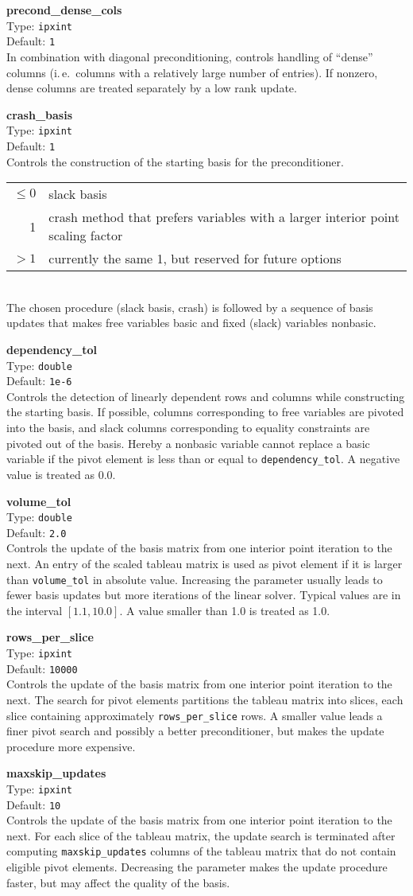 \documentclass{article}
\newcommand{\ct}{\texttt}
\newcommand{\param}[4]{
  \noindent\begin{minipage}{\textwidth}
    \textbf{#1}\\
    Type: \ct{#2}\\
    Default: \ct{#3}\\
    #4
  \end{minipage}
  \vskip 1\baselineskip
}
\begin{document}
\param{precond\_dense\_cols}{ipxint}{1}{
  In combination with diagonal preconditioning, controls handling of ``dense''
  columns (i.\,e.\ columns with a relatively large number of entries). If
  nonzero, dense columns are treated separately by a low rank update.
}

\param{crash\_basis}{ipxint}{1}{
  Controls the construction of the starting basis for the preconditioner. \\
  \begin{tabular}{rl}
    $\le0$ & slack basis \\
    1 & crash method that prefers variables with a larger interior point scaling
    factor \\
    $>1$ & currently the same 1, but reserved for future options
  \end{tabular} \\
  The chosen procedure (slack basis, crash) is followed by a sequence of basis
  updates that makes free variables basic and fixed (slack) variables nonbasic.
}

\param{dependency\_tol}{double}{1e-6}{
  Controls the detection of linearly dependent rows and columns while
  constructing the starting basis. If possible, columns corresponding to free
  variables are pivoted into the basis, and slack columns corresponding to
  equality constraints are pivoted out of the basis. Hereby a nonbasic variable
  cannot replace a basic variable if the pivot element is less than or equal to
  \ct{dependency\_tol}. A negative value is treated as 0.0.
}

\param{volume\_tol}{double}{2.0}{
  Controls the update of the basis matrix from one interior point iteration to
  the next. An entry of the scaled tableau matrix is used as pivot element if it
  is larger than \ct{volume\_tol} in absolute value. Increasing the parameter
  usually leads to fewer basis updates but more iterations of the linear solver.
  Typical values are in the interval $[1.1,10.0]$. A value smaller than 1.0 is
  treated as 1.0.
}

\param{rows\_per\_slice}{ipxint}{10000}{
  Controls the update of the basis matrix from one interior point iteration to
  the next. The search for pivot elements partitions the tableau matrix into
  slices, each slice containing approximately \ct{rows\_per\_slice} rows. A
  smaller value leads a finer pivot search and possibly a better preconditioner,
  but makes the update procedure more expensive.
}

\param{maxskip\_updates}{ipxint}{10}{
  Controls the update of the basis matrix from one interior point iteration to
  the next. For each slice of the tableau matrix, the update search is
  terminated after computing \ct{maxskip\_updates} columns of the tableau matrix
  that do not contain eligible pivot elements. Decreasing the parameter makes
  the update procedure faster, but may affect the quality of the basis.
}
\end{document}
